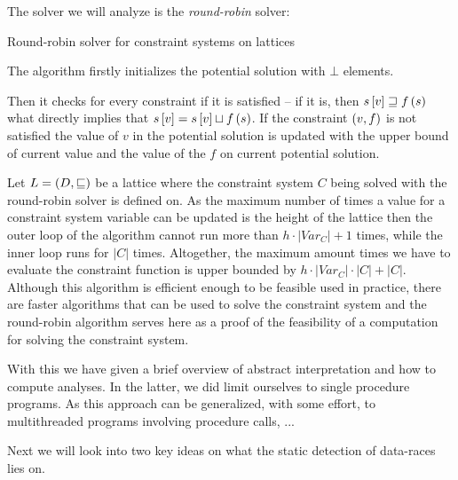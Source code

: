 \documentclass[..thesis.tex]{subfiles}
\begin{document}
The solver we will analyze is the \textit{round-robin} solver:


\begin{algorithm}[H]
\label{round-robin}
\caption{Round-robin solver for constraint systems on lattices}
\end{algorithm}
The algorithm firstly initializes the potential solution with $\bot$ elements.

Then it checks for every constraint if it is satisfied -- if it is, then $s \left[ v \right] \sqsupseteq f \left( s \right)$ what directly implies that $s \left[ v \right] = s \left[ v \right] \sqcup f \left( s \right)$. If the constraint $\left( v, f \right)$  is not satisfied the value of $v$ in the potential solution is updated with the upper bound of current value and the value of the $f$ on current potential solution.

Let $L = \left( D, \sqsubseteq \right)$ be a lattice where the constraint system $C$ being solved with the round-robin solver is defined on. As the maximum number of times a value for a constraint system variable can be updated is the height of the lattice then the outer loop of the algorithm cannot run more than $h \cdot \left| Var_C \right| + 1$ times, while the inner loop runs for $\left| C \right|$ times. Altogether, the maximum amount times we have to evaluate the constraint function is upper bounded by $h \cdot \left| Var_C \right| \cdot \left| C \right| + \left| C \right|$. Although this algorithm is efficient enough to be feasible used in practice, there are faster algorithms that can be used to solve the constraint system and the round-robin algorithm serves here as a proof of the feasibility of a computation for solving the constraint system.


With this we have given a brief overview of abstract interpretation and how to compute analyses. In the latter, we did limit ourselves to single procedure programs. As this approach can be generalized, with some effort, to multithreaded programs involving procedure calls, ...


Next we will look into two key ideas on what the static detection of data-races lies on.
\end{document}
